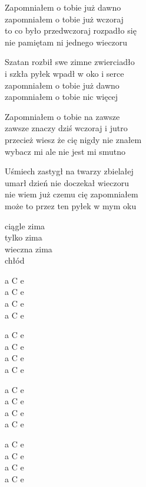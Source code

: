 \begin{text}
    \hfill\break
    Zapomniałem o tobie już dawno\\
    zapomniałem o tobie już wczoraj\\
    to co było przedwczoraj rozpadło się\\
    nie pamiętam ni jednego wieczoru

    Szatan rozbił swe zimne zwierciadło\\
    i szkła pyłek wpadł w oko i serce\\
    zapomniałem o tobie już dawno\\
    zapomniałem o tobie nic więcej

    Zapomniałem o tobie na zawsze\\
    zawsze znaczy dziś wczoraj i jutro\\
    przecież wiesz że cię nigdy nie znałem\\
    wybacz mi ale nie jest mi smutno

    Uśmiech zastygł na twarzy zbielałej\\
    umarł dzień nie doczekał wieczoru\\
    nie wiem już czemu cię zapomniałem\\
    może to przez ten pyłek w mym oku

    ciągle zima\\
    tylko zima\\
    wieczna zima\\
    chłód
\end{text}
\begin{chord}
    a C e\\
    a C e\\
    a C e\\
    a C e

    a C e\\
    a C e\\
    a C e\\
    a C e

    a C e\\
    a C e\\
    a C e\\
    a C e

    a C e\\
    a C e\\
    a C e\\
    a C e
\end{chord}